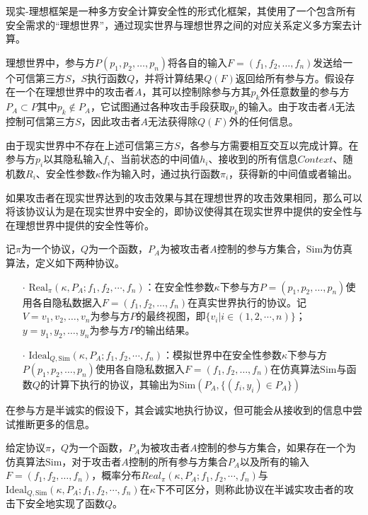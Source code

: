 现实-理想框架是一种多方安全计算安全性的形式化框架，其使用了一个包含所有安全需求的“理想世界”，通过现实世界与理想世界之间的对应关系定义多方案去计算。

理想世界中，参与方$P(p_1, p_2, \dots, p_n)$将各自的输入$F=(f_1, f_2, \dots, f_n)$发送给一个可信第三方$S$，$S$执行函数$Q$，并将计算结果$Q(F)$返回给所有参与方。假设存在一个在理想世界中的攻击者$A$，其可以控制除参与方其$p_k$外任意数量的参与方$P_A\subset P$其中$p_k\notin P_A$，它试图通过各种攻击手段获取$p_k$的输入。由于攻击者$A$无法控制可信第三方$S$，因此攻击者$A$无法获得除$Q(F)$外的任何信息。

由于现实世界中不存在上述可信第三方$S$，各参与方需要相互交互以完成计算。在参与方$p_i$以其隐私输入$f_i$、当前状态的中间值$h_i$、接收到的所有信息$Context$、随机数$R_i$、安全性参数$\kappa$作为输入时，通过执行函数$\pi_i$，获得新的中间值或者输出。

如果攻击者在现实世界达到的攻击效果与其在理想世界的攻击效果相同，那么可以将该协议认为是在现实世界中安全的，即协议使得其在现实世界中提供的安全性与在理想世界中提供的安全性等价。

\begin{definition}{}
	记$\pi$为一个协议，$Q$为一个函数，$P_A$为被攻击者$A$控制的参与方集合，$\text{Sim}$为仿真算法，定义如下两种协议。
	\begin{itemize}
		\item [$\cdot$]
			$\text{Real}_\pi(\kappa,P_A;f_1,f_2,\cdots,f_n)$：在安全性参数$\kappa$下参与方$P=(p_1, p_2, \dots, p_n)$使用各自隐私数据入$F=(f_1, f_2, \dots, f_n)$在真实世界执行的协议。记$V={v_1, v_2, \dots, v_n}$为参与方$P$的最终视图，即$\{v_i|i\in (1,2,\cdots,n)\}$；$y={y_1, y_2, \dots, y_n}$为参与方$P$的输出结果。
		\item [$\cdot$]
			$\text{Ideal}_{Q,\text{Sim}}(\kappa,P_A;f_1,f_2,\cdots,f_n)$：模拟世界中在安全性参数$\kappa$下参与方$P(p_1, p_2, \dots, p_n)$使用各自隐私数据入$F=(f_1, f_2, \dots, f_n)$在仿真算法$\text{Sim}$与函数$Q$的计算下执行的协议，其输出为$\text{Sim}(P_A,\{(f_i,y_i)\in P_A\})$			
	\end{itemize}

\end{definition}

在参与方是半诚实的假设下，其会诚实地执行协议，但可能会从接收到的信息中尝试推断更多的信息。

\begin{definition}{}
	给定协议$\pi$，$Q$为一个函数，$P_A$为被攻击者$A$控制的参与方集合，如果存在一个为仿真算法$\text{Sim}$，对于攻击者$A$控制的所有参与方集合$P_A$以及所有的输入$F=(f_1, f_2, \dots, f_n)$，概率分布$Real_\pi(\kappa,P_A;f_1,f_2,\cdots,f_n)$与$\text{Ideal}_{Q,\text{Sim}}(\kappa,P_A;f_1,f_2,\cdots,f_n)$在$\kappa$下不可区分，则称此协议在半诚实攻击者的攻击下安全地实现了函数$Q$。
\end{definition}

